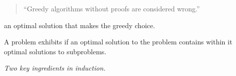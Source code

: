 
\begin{frame}{}
  \begin{quote}
    \centering
    {\large ``Greedy algorithms without proofs are considered wrong.''}
  \end{quote}

  \pause
  \begin{center}
  \end{center}

  \pause
  \vspace{0.30cm}
  \begin{theorem}
     an optimal solution that makes the greedy choice.
  \end{theorem}

  \vspace{0.50cm}
  \begin{theorem}
    A problem exhibits \emph{} if
    an optimal solution to the problem contains within it optimal solutions to subproblems.
  \end{theorem}

  \pause
  \vspace{0.60cm}
  \centerline{\it \large Two key ingredients in induction.}
\end{frame}

